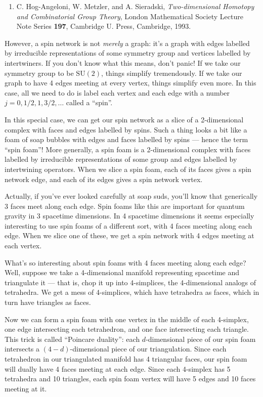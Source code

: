 \documentclass{article}
\def\tightlist{}
\begin{document}
\begin{enumerate}
\def\labelenumi{\arabic{enumi})}
\tightlist
\item
  C. Hog-Angeloni, W. Metzler, and A. Sieradski, \emph{Two-dimensional
  Homotopy and Combinatorial Group Theory}, London Mathematical Society
  Lecture Note Series \textbf{197}, Cambridge U. Press, Cambridge, 1993.
\end{enumerate}

However, a spin network is not \emph{merely} a graph: it's a graph with
edges labelled by irreducible representations of some symmetry group and
vertices labelled by intertwiners. If you don't know what this means,
don't panic! If we take our symmetry group to be \(\mathrm{SU}(2)\),
things simplify tremendously. If we take our graph to have 4 edges
meeting at every vertex, things simplify even more. In this case, all we
need to do is label each vertex and each edge with a number
\(j = 0, 1/2, 1, 3/2,\ldots\) called a ``spin''.

In this special case, we can get our spin network as a slice of a
2-dimensional complex with faces and edges labelled by spins. Such a
thing looks a bit like a foam of soap bubbles with edges and faces
labelled by spins --- hence the term ``spin foam''! More generally, a
spin foam is a 2-dimensional complex with faces labelled by irreducible
representations of some group and edges labelled by intertwining
operators. When we slice a spin foam, each of its faces gives a spin
network edge, and each of its edges gives a spin network vertex.

Actually, if you've ever looked carefully at soap suds, you'll know that
generically 3 faces meet along each edge. Spin foams like this are
important for quantum gravity in 3 spacetime dimensions. In 4 spacetime
dimensions it seems especially interesting to use spin foams of a
different sort, with 4 faces meeting along each edge. When we slice one
of these, we get a spin network with 4 edges meeting at each vertex.

What's so interesting about spin foams with 4 faces meeting along each
edge? Well, suppose we take a 4-dimensional manifold representing
spacetime and triangulate it --- that is, chop it up into 4-simplices,
the 4-dimensional analogs of tetrahedra. We get a mess of 4-simplices,
which have tetrahedra as faces, which in turn have triangles as faces.

Now we can form a spin foam with one vertex in the middle of each
4-simplex, one edge intersecting each tetrahedron, and one face
intersecting each triangle. This trick is called ``Poincare duality'':
each \(d\)-dimensional piece of our spin foam intersects a
\((4-d)\)-dimensional piece of our triangulation. Since each tetrahedron
in our triangulated manifold has 4 triangular faces, our spin foam will
dually have 4 faces meeting at each edge. Since each 4-simplex has 5
tetrahedra and 10 triangles, each spin foam vertex will have 5 edges and
10 faces meeting at it.
\end{document}
